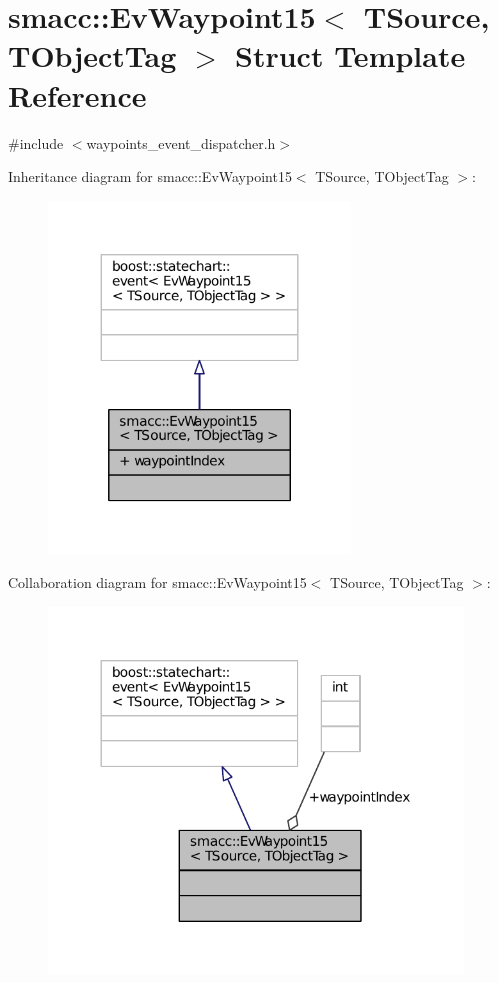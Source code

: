 \hypertarget{structsmacc_1_1EvWaypoint15}{}\section{smacc\+:\+:Ev\+Waypoint15$<$ T\+Source, T\+Object\+Tag $>$ Struct Template Reference}
\label{structsmacc_1_1EvWaypoint15}


{\ttfamily \#include $<$waypoints\+\_\+event\+\_\+dispatcher.\+h$>$}



Inheritance diagram for smacc\+:\+:Ev\+Waypoint15$<$ T\+Source, T\+Object\+Tag $>$\+:
\nopagebreak
\begin{figure}[H]
\begin{center}
\leavevmode
\includegraphics[width=227pt]{structsmacc_1_1EvWaypoint15__inherit__graph}
\end{center}
\end{figure}


Collaboration diagram for smacc\+:\+:Ev\+Waypoint15$<$ T\+Source, T\+Object\+Tag $>$\+:
\nopagebreak
\begin{figure}[H]
\begin{center}
\leavevmode
\includegraphics[width=312pt]{structsmacc_1_1EvWaypoint15__coll__graph}
\end{center}
\end{figure}
